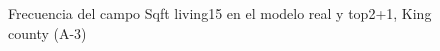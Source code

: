 \begin{figure}[H]
    \centering
    
    \caption{Frecuencia del campo Sqft living15 en el modelo real y top2+1, King county (A-3)}
    \label{frecuency-top2+1-sqft living15}
\end{figure}